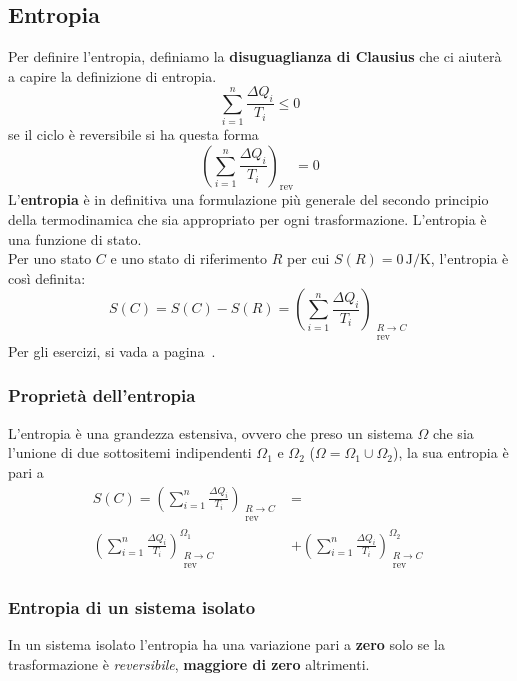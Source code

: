 \subsection{Entropia}\label{subsec:termodinamica:entropia}
Per definire l'entropia, definiamo la \textbf{disuguaglianza di Clausius} che ci aiuterà a capire la 
definizione di entropia.
\begin{equation*}
\sum\limits_{i = 1}^{n}\frac{\Delta Q_i}{T_i} \leq 0
\end{equation*}
se il ciclo è reversibile si ha questa forma
\begin{equation*}
\left(\sum\limits_{i = 1}^{n}\frac{\Delta Q_i}{T_i}\right)_\text{rev} = 0
\end{equation*}
L'\textbf{entropia} è in definitiva una formulazione più generale del secondo principio della 
termodinamica che sia appropriato per ogni trasformazione. L'entropia è una funzione di stato.\\
Per uno stato $C$ e uno stato di riferimento $R$ per cui $S(R) = 0\,\text{J/K}$, l'entropia è così 
definita:
\begin{equation*}
S(C) = S(C) - S(R) = \left(\sum\limits_{i = 1}^{n}\frac{\Delta Q_i}{T_i}\right)_{\substack{R\to C\\
\text{rev}}}
\end{equation*}
Per gli esercizi, si vada a pagina~\pageref{ex:entropia}.

\subsubsection{Proprietà dell'entropia}
L'entropia è una grandezza estensiva, ovvero che preso un sistema $\Omega$ che sia l'unione di due
sottositemi indipendenti $\Omega_1$ e $\Omega_2$ ($\Omega = \Omega_1 \cup \Omega_2$), la sua entropia
è pari a
\begin{align*}
S(C) = \left(\sum\limits_{i=1}^{n}\frac{\Delta Q_i}{T_i}\right)_{\substack{R\to C\\\text{rev}}} &=\\ 
\left(\sum\limits_{i=1}^{n}\frac{\Delta Q_i}{T_i}\right)^{\Omega_1}_{\substack{R\to C\\\text{rev}}} &+
\left(\sum\limits_{i=1}^{n}\frac{\Delta Q_i}{T_i}\right)^{\Omega_2}_{\substack{R\to C\\\text{rev}}}
\end{align*}

\subsubsection{Entropia di un sistema isolato}
In un sistema isolato l'entropia ha una variazione pari a \textbf{zero} solo se la trasformazione è
\textit{reversibile}, \textbf{maggiore di zero} altrimenti.

